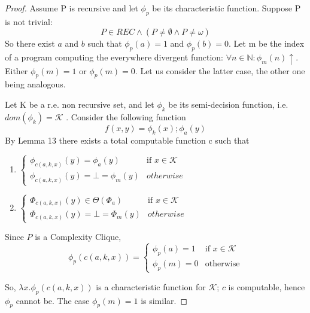 \documentclass[10pt, a4paper, oneside, titlepage, draft]{article}
\begin{document}
\begin{proof}
    Assume P is recursive and let $\phi_p$ be its characteristic function. 
    Suppose P is not trivial:
    \begin{equation*}
        P \in REC \wedge (P \neq \emptyset \wedge P \neq \omega)
    \end{equation*}
    So there exist $a$ and $b$ such that $\phi_p(a) = 1$ and $\phi_p(b) = 0$.
    Let m be the index of a program computing the everywhere divergent function: $\forall n \in \mathbb{N} : \phi_m(n) \uparrow$.
    Either $\phi_p(m) = 1$ or $\phi_p(m) = 0$. Let us consider the latter case, the other one being analogous. \par
    Let K be a r.e. non recursive set, and let $\phi_k$ be its semi-decision function, i.e. $dom(\phi_k) = \mathcal{K}$ . Consider the following function 
    \begin{equation*}
        f(x,y) = \phi_k(x); \phi_a(y)
    \end{equation*}
    By Lemma 13 there exists a total computable function c such that
    \begin{enumerate}[label=(\alph*)]
        \item $
            \begin{cases}
                \phi_{c(a,k,x)}(y) = \phi_a(y)  & \text{if  } x \in \mathcal{K} \\
                \phi_{c(a,k,x)}(y) = \bot = \phi_m(y)       & otherwise
            \end{cases}
        $

        \item $
            \begin{cases}
                \Phi_{c(a,k,x)}(y) \in \Theta ( \Phi_a )  & \text{if  } x \in \mathcal{K} \\
                \Phi_{c(a,k,x)}(y) = \bot = \Phi_m(y)       & otherwise
            \end{cases}
        $
    \end{enumerate}
Since $P$ is a Complexity Clique,
    \begin{equation*}
        \phi_p(c(a,k,x)) = 
        \begin{cases}
            \phi_p(a) = 1   & \text{if  } x \in \mathcal{K}           \\
            \phi_p(m) = 0   & \text{otherwise}
        \end{cases}
    \end{equation*}

    So, $\lambda x . \phi_p(c(a,k,x))$ is a characteristic function for $\mathcal{K}$; $c$ is computable, hence $\phi_p$ cannot be. The case $\phi_p(m) = 1$ is similar.

\end{proof}
\end{document}
